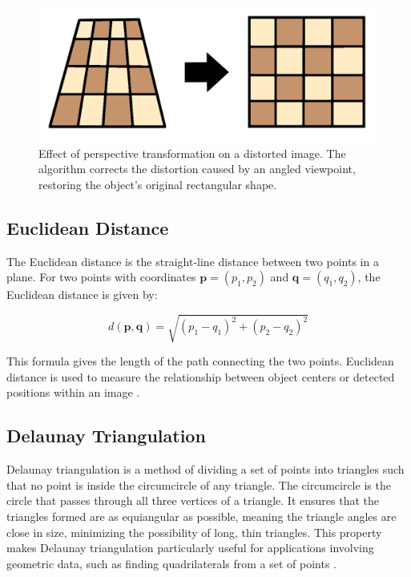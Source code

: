 \begin{figure}[h!]
    \centering
    \includegraphics[width=0.75\linewidth]{figures/theory/image-recognition/perspective-transformation.png}
    \caption[Perspective transformation before and after]{Effect of perspective transformation on a distorted image. The algorithm corrects the distortion caused by an angled viewpoint, restoring the object’s original rectangular shape.}
    \label{fig:perspective-transformation}
\end{figure}

\subsection{Euclidean Distance}
\label{subsec:euclidean-distance}

The Euclidean distance is the straight-line distance between two points in a plane. For two points with coordinates \( \mathbf{p} = (p_1, p_2) \) and \( \mathbf{q} = (q_1, q_2) \), the Euclidean distance is given by:

\[
d(\mathbf{p}, \mathbf{q}) = \sqrt{(p_1 - q_1)^2 + (p_2 - q_2)^2}
\]

This formula gives the length of the path connecting the two points. Euclidean distance is used to measure the relationship between object centers or detected positions within an image \cite{cohen:precalculus}.

\subsection{Delaunay Triangulation}
\label{subsec:delaunay-triangulation}

Delaunay triangulation is a method of dividing a set of points into triangles such that no point is inside the circumcircle of any triangle. The circumcircle is the circle that passes through all three vertices of a triangle. It ensures that the triangles formed are as equiangular as possible,  meaning the triangle angles are close in size, minimizing the possibility of long, thin triangles. This property makes Delaunay triangulation particularly useful for applications involving geometric data, such as finding quadrilaterals from a set of points \cite{ianthehenry:delaunay}.

